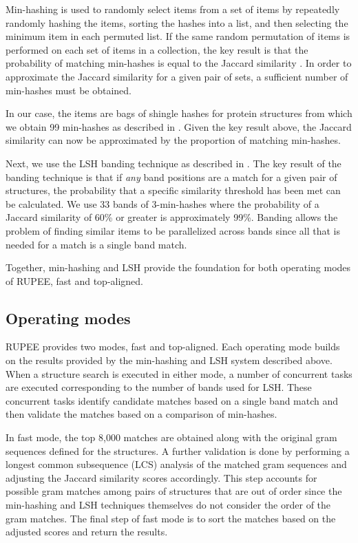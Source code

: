 \documentclass[letter,center,fleqn]{NAR}
\begin{document}
Min-hashing is used to randomly select items from a set of items by repeatedly randomly hashing the items, sorting the hashes into a list, and then selecting the minimum item in each permuted list.
If the same random permutation of items is performed on each set of items in a collection, the key result is that the probability of matching min-hashes is equal to the Jaccard similarity \cite{Broder1998}.
In order to approximate the Jaccard similarity for a given pair of sets, a sufficient number of min-hashes must be obtained. 

In our case, the items are bags of shingle hashes for protein structures from which we obtain 99 min-hashes as described in \cite{Rajaraman2012}. 
Given the key result above, the Jaccard similarity can now be approximated by the proportion of matching min-hashes. 

Next, we use the LSH banding technique as described in \cite{Rajaraman2012}.
The key result of the banding technique is that if \emph{any} band positions are a match for a given pair of structures, the probability that a specific similarity threshold has been met can be calculated. 
We use 33 bands of 3-min-hashes where the probability of a Jaccard similarity of 60\% or greater is approximately 99\%. 
Banding allows the problem of finding similar items to be parallelized across bands since all that is needed for a match is a single band match. 

Together, min-hashing and LSH provide the foundation for both operating modes of RUPEE, fast and top-aligned.

\subsection{Operating modes}

RUPEE provides two modes, fast and top-aligned. 
Each operating mode builds on the results provided by the min-hashing and LSH system described above. 
When a structure search is executed in either mode, a number of concurrent tasks are executed corresponding to the number of bands used for LSH. 
These concurrent tasks identify candidate matches based on a single band match and then validate the matches based on a comparison of min-hashes. 

In fast mode, the top 8,000 matches are obtained along with the original gram sequences defined for the structures.
A further validation is done by performing a longest common subsequence (LCS) analysis of the matched gram sequences and adjusting the Jaccard similarity scores accordingly.
This step accounts for possible gram matches among pairs of structures that are out of order since the min-hashing and LSH techniques themselves do not consider the order of the gram matches.
The final step of fast mode is to sort the matches based on the adjusted scores and return the results. 
\end{document}
